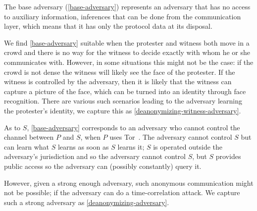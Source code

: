 The base adversary (\cref{base-adversary}) represents an adversary that has no 
access to auxiliary information, \eg inferences that can be done from the 
communication layer, which means that it has only the protocol data at its 
disposal.

We find \cref{base-adversary} suitable when the protester and witness both move 
in a crowd and there is no way for the witness to decide exactly with whom he 
or she communicates with.
However, in some situations this might not be the case: \Eg if the crowd is not 
dense the witness will likely see the face of the protester.
If the witness is controlled by the adversary, then it is likely that the 
witness can capture a picture of the face, which can be turned into an identity 
through face recognition.
There are various such scenarios leading to the adversary learning the 
protester's identity, we capture this as 
\cref{deanonymizing-witness-adversary}.

As to \(S\), \cref{base-adversary} corresponds to an adversary who cannot 
control the channel between \(P\) and \(S\), \eg when \(P\) uses 
Tor~\cite{Tor}.
The adversary cannot control \(S\) but can learn what \(S\) learns as soon as 
\(S\) learns it; \eg \(S\) is operated outside the adversary's jurisdiction and 
so the adversary cannot control \(S\), but \(S\) provides public access so the 
adversary can (possibly constantly) query it.

However, given a strong enough adversary, such anonymous communication might 
not be possible; \eg if the adversary can do a time-correlation attack.
We capture such a strong adversary as \cref{deanonymizing-adversary}.

